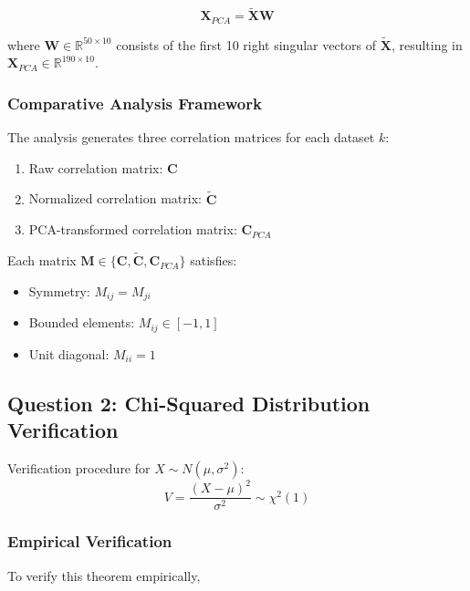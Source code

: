\documentclass[12pt]{article}
\begin{document}
\begin{equation}
    \mathbf{X}_{PCA} = \tilde{\mathbf{X}}\mathbf{W}
\end{equation}

where $\mathbf{W} \in \mathbb{R}^{50 \times 10}$ consists of the first 10 right singular vectors of $\tilde{\mathbf{X}}$, resulting in $\mathbf{X}_{PCA} \in \mathbb{R}^{190 \times 10}$.

\subsubsection{Comparative Analysis Framework}
The analysis generates three correlation matrices for each dataset $k$:
\begin{enumerate}
    \item Raw correlation matrix: $\mathbf{C}$
    \item Normalized correlation matrix: $\tilde{\mathbf{C}}$
    \item PCA-transformed correlation matrix: $\mathbf{C}_{PCA}$
\end{enumerate}

Each matrix $\mathbf{M} \in \{\mathbf{C}, \tilde{\mathbf{C}}, \mathbf{C}_{PCA}\}$ satisfies:
\begin{itemize}
    \item Symmetry: $M_{ij} = M_{ji}$
    \item Bounded elements: $M_{ij} \in [-1,1]$
    \item Unit diagonal: $M_{ii} = 1$
\end{itemize}

\subsection{Question 2: Chi-Squared Distribution Verification}
Verification procedure for $X \sim N(\mu, \sigma^2)$:
\begin{equation}
    V = \frac{(X-\mu)^2}{\sigma^2} \sim \chi^2(1)
\end{equation}


\subsubsection{Empirical Verification}
To verify this theorem empirically, 
\end{document}
